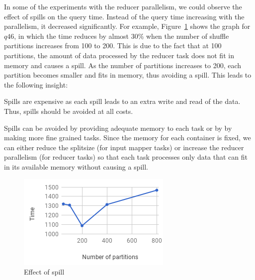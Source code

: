 In some of the experiments with the reducer parallelism, we could observe the effect of spills on the query time. Instead of the query time increasing with the parallelism, it decreased significantly. For example, Figure~\ref{fig:q46} shows the graph for $q46$, in which the time reduces by almost 30\% when the number of shuffle partitions increases from 100 to 200. This is due to the fact that at 100 partitions, the amount of data processed by the reducer task does not fit in memory and causes a spill. As the number of partitions increases to 200, each partition becomes smaller and fits in memory, thus avoiding a spill. This leads to the following insight:
\begin{insight}
	\label{insight:spill}
	Spills are expensive as each spill leads to an extra write and read of the data. Thus, spills should be avoided at all costs.
\end{insight}
Spills can be avoided by providing adequate memory to each task or by by making more fine grained tasks. Since the memory for each container is fixed, we can either reduce the splitsize (for input mapper tasks) or increase the reducer parallelism (for reducer tasks) so that each task processes only data that can fit in its available memory without causing a spill.

\begin{figure}[h]
	\includegraphics[width=\linewidth]{fig/q46.png}
	\caption{Effect of spill}
	\label{fig:q46}
\end{figure}


